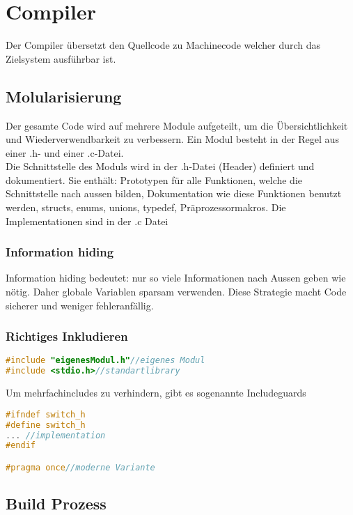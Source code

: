 \section{Compiler}
Der Compiler übersetzt den Quellcode zu Machinecode welcher durch das Zielsystem ausführbar ist.
\subsection{Molularisierung}

Der gesamte Code wird auf mehrere Module aufgeteilt, um die Übersichtlichkeit und Wiederverwendbarkeit zu verbessern. Ein Modul besteht in der Regel aus einer .h- und einer .c-Datei.\\
Die Schnittstelle des Moduls wird in der .h-Datei (Header) definiert und dokumentiert. Sie enthält: Prototypen für alle Funktionen, welche die Schnittstelle nach aussen bilden, Dokumentation wie diese Funktionen benutzt werden, structs, enums, unions, typedef, Präprozessormakros. Die Implementationen sind in der .c Datei

\subsubsection{Information hiding}

Information hiding bedeutet: nur so viele Informationen nach Aussen geben wie nötig. Daher globale Variablen sparsam verwenden. Diese Strategie macht Code sicherer und weniger fehleranfällig.

\subsubsection{Richtiges Inkludieren}

\begin{lstlisting}[language = c]
#include "eigenesModul.h"//eigenes Modul
#include <stdio.h>//standartlibrary
\end{lstlisting}


Um mehrfachincludes zu verhindern, gibt es sogenannte Includeguards
\begin{lstlisting}[language = c]
#ifndef switch_h
#define switch_h
... //implementation
#endif

#pragma once//moderne Variante
\end{lstlisting}

\subsection{Build Prozess}

